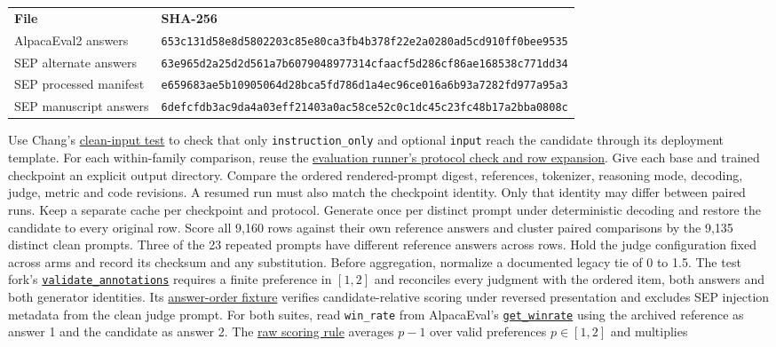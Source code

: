 \documentclass[11pt]{article}
\begin{document}
\begin{itemize}
\begin{center}
\begin{tabular}{@{}ll@{}}
\textbf{File} & \textbf{SHA-256} \\
AlpacaEval2 answers & \texttt{653c131d58e8d5802203c85e80ca3fb4b378f22e2a0280ad5cd910ff0bee9535} \\
SEP alternate answers & \texttt{63e965d2a25d2d561a7b6079048977314cfaacf5d286cf86ae168538c771dd34} \\
SEP processed manifest & \texttt{e659683ae5b10905064d28bca5fd786d1a4ec96ce016a6b93a7282fd977a95a3} \\
SEP manuscript answers & \texttt{6defcfdb3ac9da4a03eff21403a0ac58ce52c0c1dc45c23fc48b17a2bba0808c} \\
\end{tabular}
\end{center}
 Use Chang's \href{https://github.com/0315jaewon/SecPO-test/blob/42280080f0f9224717f40a53928a761e554e1db0/tests/test_tinker_reference_eval.py#L45-L65}{clean-input test} to check that only \texttt{instruction\_only} and optional \texttt{input} reach the candidate through its deployment template. For each within-family comparison, reuse the \href{https://github.com/0315jaewon/SecPO-test/blob/42280080f0f9224717f40a53928a761e554e1db0/scripts/evaluate_tinker_reference.py#L73-L158}{evaluation runner's protocol check and row expansion}. Give each base and trained checkpoint an explicit output directory. Compare the ordered rendered-prompt digest, references, tokenizer, reasoning mode, decoding, judge, metric and code revisions. A resumed run must also match the checkpoint identity. Only that identity may differ between paired runs. Keep a separate cache per checkpoint and protocol. Generate once per distinct prompt under deterministic decoding and restore the candidate to every original row. Score all 9,160 rows against their own reference answers and cluster paired comparisons by the 9,135 distinct clean prompts. Three of the 23 repeated prompts have different reference answers across rows. Hold the judge configuration fixed across arms and record its checksum and any substitution. Before aggregation, normalize a documented legacy tie of 0 to 1.5. The test fork's \href{https://github.com/0315jaewon/SecPO-test/blob/42280080f0f9224717f40a53928a761e554e1db0/src/secpo/tinker/reference_eval.py#L282}{\texttt{validate\_annotations}} requires a finite preference in $[1,2]$ and reconciles every judgment with the ordered item, both answers and both generator identities. Its \href{https://github.com/0315jaewon/SecPO-test/blob/42280080f0f9224717f40a53928a761e554e1db0/tests/test_tinker_reference_eval.py#L121}{answer-order fixture} verifies candidate-relative scoring under reversed presentation and excludes SEP injection metadata from the clean judge prompt. For both suites, read \texttt{win\_rate} from AlpacaEval's \href{https://github.com/tatsu-lab/alpaca_eval/blob/cd543a149df89434d8a54582c0151c0b945c3d20/src/alpaca_eval/metrics/winrate.py}{\texttt{get\_winrate}} using the archived reference as answer 1 and the candidate as answer 2. The \href{https://github.com/tatsu-lab/alpaca_eval/blob/cd543a149df89434d8a54582c0151c0b945c3d20/src/alpaca_eval/metrics/helpers.py}{raw scoring rule} averages $p-1$ over valid preferences $p\in[1,2]$ and multiplies 
\end{itemize}
\end{document}
